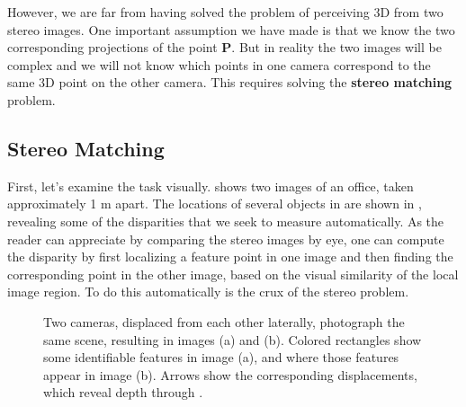 However, we are far from having solved the problem of perceiving 3D from two stereo images. One important assumption we have made is that we know the two corresponding projections of the point $\mathbf{P}$. But in reality the two images will be complex and we will not know which points in one camera correspond to the same 3D point on the other camera. This requires solving the {\bf stereo matching} problem.

\subsection{Stereo Matching}


First, let's examine the task visually.   \Fig{\ref{fig:stereomatch}} shows two images of an office, taken approximately 1 m apart.  The locations of several objects in  are shown in , revealing some of the disparities that we seek to measure automatically.  As the reader can appreciate by comparing the stereo images by eye, one can compute the disparity by first localizing a feature point in one image and then finding the corresponding point in the other image, based on the visual similarity of the local image region.  To do this automatically is the crux of the stereo problem.




\begin{figure}[t]
    \centerline{
    }
    \caption{Two cameras, displaced from each other laterally, photograph the same scene, resulting in images (a) and (b).  Colored rectangles show some identifiable features in image (a), and where those features appear in image (b).  Arrows show the corresponding displacements, which reveal depth through \eqn{\ref{eq:depthFromDisparity}}.}
    \label{fig:stereomatch}
\end{figure}



